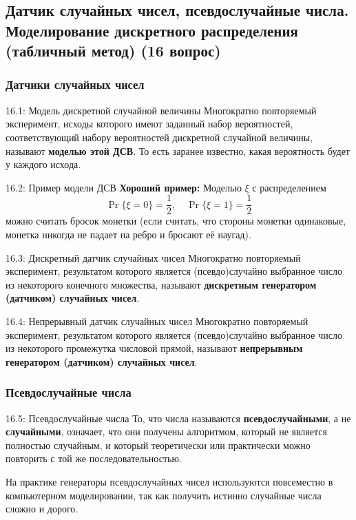 \documentclass[a4paper,12pt]{article}
\begin{document}
	\subsection{Датчик случайных чисел, псевдослучайные числа. Моделирование дискретного распределения (табличный метод) (16 вопрос)}
	
	\subsubsection{Датчики случайных чисел}
	
	\begin{definitionbox}{16.1: Модель дискретной случайной величины}
		Многократно повторяемый эксперимент, исходы которого имеют заданный набор вероятностей, соответствующий набору вероятностей дискретной случайной величины, называют \textbf{моделью этой ДСВ}. То есть заранее известно, какая вероятность будет у каждого исхода.
	\end{definitionbox}
	
	\begin{examplebox}{16.2: Пример модели ДСВ}
		\textbf{Хороший пример:} Моделью \(\xi\) с распределением
		\[ \Pr\{\xi = 0\} = \frac{1}{2}, \quad \Pr\{\xi = 1\} = \frac{1}{2} \]
		можно считать бросок монетки (если считать, что стороны монетки одинаковые, монетка никогда не падает на ребро и бросают её наугад).
	\end{examplebox}
	
	\begin{definitionbox}{16.3: Дискретный датчик случайных чисел}
		Многократно повторяемый эксперимент, результатом которого является (псевдо)случайно выбранное число из некоторого конечного множества, называют \textbf{дискретным генератором (датчиком) случайных чисел}.
	\end{definitionbox}
	
	\begin{definitionbox}{16.4: Непрерывный датчик случайных чисел}
		Многократно повторяемый эксперимент, результатом которого является (псевдо)случайно выбранное число из некоторого промежутка числовой прямой, называют \textbf{непрерывным генератором (датчиком) случайных чисел}.
	\end{definitionbox}
	
	\subsubsection{Псевдослучайные числа}
	
	\begin{importantbox}{16.5: Псевдослучайные числа}
		То, что числа называются \textbf{псевдослучайными}, а не \textbf{случайными}, означает, что они получены алгоритмом, который не является полностью случайным, и который теоретически или практически можно повторить с той же последовательностью.
		
		На практике генераторы псевдослучайных чисел используются повсеместно в компьютерном моделировании, так как получить истинно случайные числа сложно и дорого.
	\end{importantbox}
	
\end{document}
